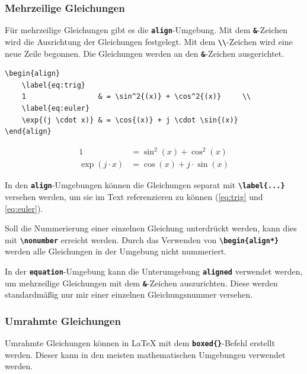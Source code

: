 \newpage

\subsubsection{Mehrzeilige Gleichungen}
Für mehrzeilige Gleichungen gibt es die \textbf{\texttt{align}}-Umgebung. Mit dem \textbf{\texttt{\&}}-Zeichen wird die Ausrichtung der Gleichungen festgelegt. Mit dem \textbf{\texttt{\textbackslash\textbackslash}}-Zeichen wird eine neue Zeile begonnen. Die Gleichungen werden an den \textbf{\texttt{\&}}-Zeichen ausgerichtet.

\begin{lstlisting}[language={[LaTeX]TeX}]
\begin{align}
    \label{eq:trig}
    1                 & = \sin^2{(x)} + \cos^2{(x)}     \\
    \label{eq:euler}
    \exp{(j \cdot x)} & = \cos{(x)} + j \cdot \sin{(x)}
\end{align}
\end{lstlisting}

\begin{align}
    \label{eq:trig}
    1                 & = \sin^2{(x)} + \cos^2{(x)}     \\
    \label{eq:euler}
    \exp{(j \cdot x)} & = \cos{(x)} + j \cdot \sin{(x)}
\end{align}

In den \textbf{\texttt{align}}-Umgebungen können die Gleichungen separat mit \textbf{\texttt{\textbackslash label\{...\}}} versehen werden, um sie im Text referenzieren zu können (\autoref{eq:trig} und \autoref{eq:euler}).

Soll die Nummerierung einer einzelnen Gleichung unterdrückt werden, kann dies mit \textbf{\texttt{\textbackslash nonumber}} erreicht werden. Durch das Verwenden von \textbf{\texttt{\textbackslash begin\{align*\}}} werden alle Gleichungen in der Umgebung nicht nummeriert.

In der \textbf{\texttt{equation}}-Umgebung kann die Unterumgebung \textbf{\texttt{aligned}} verwendet werden, um mehrzeilige Gleichungen mit dem \textbf{\texttt{\&}}-Zeichen auszurichten. Diese werden standardmäßig nur mir einer einzelnen Gleichungsnummer versehen.

\subsubsection{Umrahmte Gleichungen}
Umrahmte Gleichungen können in \LaTeX{} mit dem \textbf{\texttt{boxed\{\}}}-Befehl erstellt werden. Dieser kann in den meisten mathematischen Umgebungen verwendet werden.

